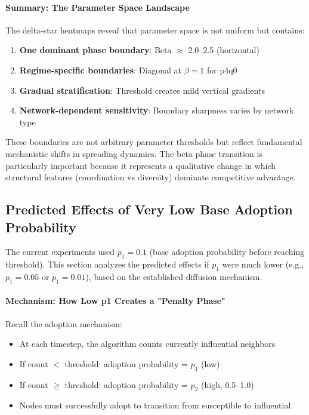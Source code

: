 \documentclass[12pt,a4paper]{article}
\begin{document}
\paragraph{Summary: The Parameter Space Landscape}

The delta-star heatmaps reveal that parameter space is not uniform but contains:
\begin{enumerate}
    \item \textbf{One dominant phase boundary}: Beta $\approx$ 2.0--2.5 (horizontal)
    \item \textbf{Regime-specific boundaries}: Diagonal at $\beta=1$ for p4q0
    \item \textbf{Gradual stratification}: Threshold creates mild vertical gradients
    \item \textbf{Network-dependent sensitivity}: Boundary sharpness varies by network type
\end{enumerate}

These boundaries are not arbitrary parameter thresholds but reflect fundamental mechanistic shifts in spreading dynamics. The beta phase transition is particularly important because it represents a qualitative change in which structural features (coordination vs diversity) dominate competitive advantage.

\subsection{Predicted Effects of Very Low Base Adoption Probability}

The current experiments used $p_1 = 0.1$ (base adoption probability before reaching threshold). This section analyzes the predicted effects if $p_1$ were much lower (e.g., $p_1 = 0.05$ or $p_1 = 0.01$), based on the established diffusion mechanism.

\paragraph{Mechanism: How Low p1 Creates a "Penalty Phase"}

Recall the adoption mechanism:
\begin{itemize}
    \item At each timestep, the algorithm counts currently influential neighbors
    \item If count $<$ threshold: adoption probability = $p_1$ (low)
    \item If count $\geq$ threshold: adoption probability = $p_2$ (high, 0.5--1.0)
    \item Nodes must successfully adopt to transition from susceptible to influential
\end{itemize}
\end{document}
